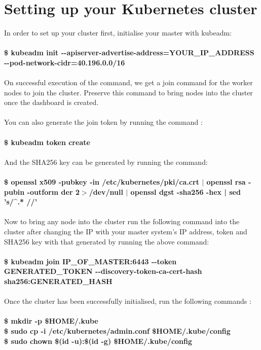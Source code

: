 \documentclass[12pt]{report}
\begin{document}
\section{Setting up your Kubernetes cluster}
In order to set up your cluster first, initialise your master with kubeadm:\\\\
\textbf{\$ kubeadm init  -{}-apiserver-advertise-address=YOUR\_IP\_ADDRESS    -{}-pod-network-cidr=40.196.0.0/16}\\\\
On successful execution of the command, we get a join command for the worker nodes to join the cluster. Preserve this command to bring nodes into the cluster once the dashboard is created.\\\\
You can also generate the join token by running the command :\\\\
\textbf{\$ kubeadm token create}\\\\
And the SHA256 key can be generated by running the command:\\\\
\textbf{\$ openssl x509 -pubkey -in /etc/kubernetes/pki/ca.crt $|$ openssl rsa -pubin -outform der 2$>$/dev/null $|$ openssl dgst -sha256 -hex | sed 's/\string^.* //'}\\\\
Now to bring any node into the cluster run the following command into the cluster after changing the IP with your master system’s IP address, token and SHA256 key with that generated by running the above command:\\\\
\textbf{\$ kubeadm join IP\_OF\_MASTER:6443 -{}-token GENERATED\_TOKEN -{}-discovery-token-ca-cert-hash sha256:GENERATED\_HASH}\\\\
Once the cluster has been successfully initialised, run the following commands :\\\\
\textbf{
	\$ mkdir -p \$HOME/.kube\\
	\$ sudo cp -i /etc/kubernetes/admin.conf \$HOME/.kube/config\\
	\$ sudo chown \$(id -u):\$(id -g) \$HOME/.kube/config
}
\end{document}
